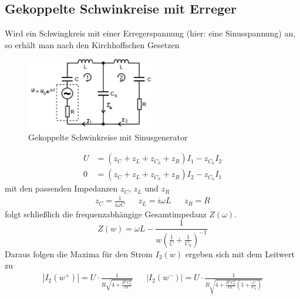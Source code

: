 \subsection{Gekoppelte Schwinkreise mit Erreger}
Wird ein Schwingkreis mit einer Erregerspannung (hier: eine Sinusspannung) an,
so erhält man nach den Kirchhoffschen Gesetzen
\begin{figure}[H]
    \centering
    \includegraphics[width=0.5\textwidth]{bilder/schwingkreis_sinus.jpg}
    \caption{Gekoppelte Schwinkreise mit Sinusgenerator \cite[303]{Anleitung}}
\end{figure} 
\begin{align}
    U&=(z_C+z_L+z_{C_k}+z_R)I_1-z_{C_k}I_2 \label{schw1}\\
    0&=(z_C+z_L+z_{C_k}+z_R)I_2-z_{C_k}I_1 \label{schw2}
\end{align}
mit den passenden Impedanzen $z_C$, $z_L$ und $z_R$
\begin{align*}
    z_C=\frac{1}{i\omega C}&
    &z_L=i \omega L&
    &z_R=R
\end{align*}
folgt schließlich die frequenzabhängige Gesamtimpedanz $Z(\omega)$.
\begin{equation}
    Z(w)=\omega L -\frac{1}{w(\frac{1}{C}+\frac{1}{C_k})^{-1}}
\end{equation}
Daraus folgen die Maxima für den Strom $I_2(w)$ ergeben sich mit dem Leitwert zu
\begin{align}
    |I_2(w^+)|=U\cdot\frac{1}{R\sqrt{4+\frac{R^2C_k^2}{LC}}}&&
    |I_2(w^-)|=U\cdot\frac{1}{R\sqrt{4+\frac{R^2C_k^2}{LC}(1+\frac{C}{C_k})}}
\end{align}

\label{sec:theorie}